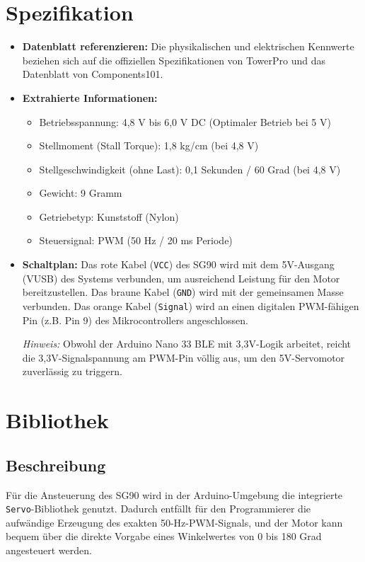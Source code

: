 \section{Spezifikation}
\begin{itemize}
	\item \textbf{Datenblatt referenzieren:} Die physikalischen und elektrischen Kennwerte beziehen sich auf die offiziellen Spezifikationen von TowerPro und das Datenblatt von Components101.
	\item \textbf{Extrahierte Informationen:}
	\begin{itemize}
		\item Betriebsspannung: 4,8 V bis 6,0 V DC (Optimaler Betrieb bei 5 V)
		\item Stellmoment (Stall Torque): 1,8 kg/cm (bei 4,8 V)
		\item Stellgeschwindigkeit (ohne Last): 0,1 Sekunden / 60 Grad (bei 4,8 V)
		\item Gewicht: 9 Gramm
		\item Getriebetyp: Kunststoff (Nylon)
		\item Steuersignal: PWM (50 Hz / 20 ms Periode)
	\end{itemize}
	\item \textbf{Schaltplan:} Das rote Kabel (\texttt{VCC}) des SG90 wird mit dem 5V-Ausgang (VUSB) des Systems verbunden, um ausreichend Leistung für den Motor bereitzustellen. Das braune Kabel (\texttt{GND}) wird mit der gemeinsamen Masse verbunden. Das orange Kabel (\texttt{Signal}) wird an einen digitalen PWM-fähigen Pin (z.B. Pin 9) des Mikrocontrollers angeschlossen. 
	
	\textit{Hinweis:} Obwohl der Arduino Nano 33 BLE mit 3,3V-Logik arbeitet, reicht die 3,3V-Signalspannung am PWM-Pin völlig aus, um den 5V-Servomotor zuverlässig zu triggern.
\end{itemize}

\section{Bibliothek}

\subsection{Beschreibung}
Für die Ansteuerung des SG90 wird in der Arduino-Umgebung die integrierte \texttt{Servo}-Bibliothek genutzt. Dadurch entfällt für den Programmierer die aufwändige Erzeugung des exakten 50-Hz-PWM-Signals, und der Motor kann bequem über die direkte Vorgabe eines Winkelwertes von 0 bis 180 Grad angesteuert werden.

